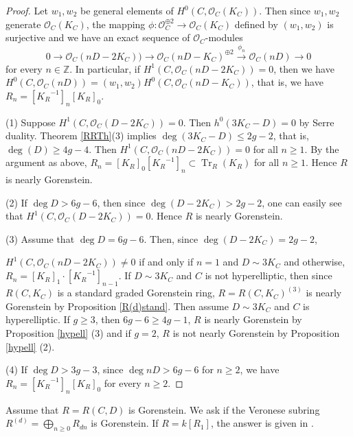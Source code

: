 \documentclass[12pt]{amsart}
\theoremstyle{definition}
\theoremstyle{remark}
\numberwithin{equation}{section}
\DeclareMathOperator{\Tr}{Tr}
\newcommand{\KiR}{{K_R}^{-1}}
\newcommand{\Z}{\mathbb Z}
\newcommand{\cO}{\mathcal O}
\renewcommand{\:}{\colon}
\begin{document}
\begin{proof} 
Let $w_1, w_2$ be general elements of $H^0( C, \cO_C(K_C))$.
Then since $w_1, w_2$ generate $\cO_C(K_C)$, the mapping 
 $\phi : \cO_C^{\oplus 2} \to \cO_C(K_C) $ defined by $(w_1,w_2)$ is surjective and 
 we have an exact sequence of $\cO_C$-modules
\[ 0 \to \cO_C( nD - 2K_C)) \to \cO_C(nD - K_C)^{\oplus 2} \overset{\phi_n}\to \cO_C( nD) \to 0\]  
for every $n \in \Z$. 
In particular, if $H^1(C, \cO_C(nD-2K_C))=0$, then we have 
$H^0(C, \cO_C(nD)) = (w_1, w_2)H^0(C, \cO_C(nD - K_C))$, that is, we have $R_n = [\KiR]_n [K_R]_0$.  
\par \vspace{2mm}
(1) Suppose $H^1(C, \cO_C(D-2K_C))=0$. 
Then $h^0(3K_C-D)=0$ by Serre duality. 
Theorem \ref{RRTh}(3) implies $\deg(3K_C-D) \le 2g-2$, that is, 
$\deg(D) \ge 4g-4$. 
Then $H^1(C,\cO_C(nD-2K_C))=0$ for all $n \ge 1$.  
By the argument as above, $R_n=[K_R]_0[\KiR]_n \subset \Tr_R(K_R)$ for all $n \ge 1$. 
Hence $R$ is nearly Gorenstein. 
\par  \vspace{1mm}
(2) If $\deg D > 6g -6$, then since $\deg(D - 2K_C) > 2g-2$, 
one can easily see that $H^1(C,\cO_{C}(D-2K_C))=0$. 
Hence $R$ is nearly Gorenstein. 
\par  \vspace{1mm}
(3) Assume that $\deg D=6g-6$. Then, since $\deg (D- 2K_C) = 2g-2$, \par\noindent
$H^1(C, \cO_C(nD - 2K_C))\ne 0$ if and only if $n=1$ and $D \sim 3 K_C$ and otherwise,  
$R_n= [K_R]_1\cdot [\KiR]_{n-1}$.   If $D \sim 3 K_C$ and $C$ is not hyperelliptic, 
then since $R(C, K_C)$ is a standard graded Gorenstein ring, 
$R=R(C, K_C)^{(3)}$ is nearly Gorenstein by  Proposition \ref{R(d)stand}. 
Then assume $D \sim 3 K_C$ and $C$ is hyperelliptic. If $g\ge 3$, then $6g-6 \ge 4g-1$, 
$R$ is nearly Gorenstein by   Proposition \ref{hypell} (3) and if $g=2$, 
$R$ is not nearly Gorenstein by  Proposition \ref{hypell} (2). 
\par  \vspace{1mm}
(4) If   $\deg D > 3g -3$, since $\deg nD > 6g-6$ for $n\ge 2$, we have 
$R_n = [\KiR]_n [K_R]_0$ for every $n\ge 2$. 
\end{proof}

\par 
Assume that $R=R(C,D)$ is Gorenstein. 
We ask if the Veronese subring 
$R^{(d)}= \bigoplus_{n\ge 0} R_{dn}$ is Gorenstein.  
If $R=k[R_1]$, the answer is given in \cite{HHS}.   
\end{document}
